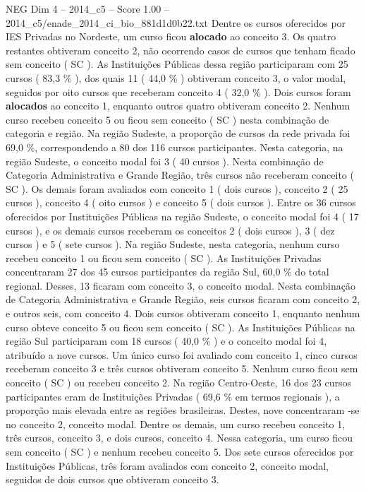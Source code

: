 \begin{textsample}{NEG Dim 4 – 2014\_c5 – Score 1.00 – 2014\_c5/enade\_2014\_ci\_bio\_881d1d0b22.txt}
Dentre os cursos oferecidos por IES Privadas no Nordeste, um curso ficou \textbf{alocado} ao conceito 3.
Os quatro restantes obtiveram conceito 2, não ocorrendo casos de cursos que tenham ficado sem conceito ( SC ).
As Instituições Públicas dessa região participaram com 25 cursos ( 83,3 \% ), dos quais 11 ( 44,0 \% ) obtiveram conceito 3, o valor modal, seguidos por oito cursos que receberam conceito 4 ( 32,0 \% ).
Dois cursos foram \textbf{alocados} ao conceito 1, enquanto outros quatro obtiveram conceito 2.
Nenhum curso recebeu conceito 5 ou ficou sem conceito ( SC ) nesta combinação de categoria e região.
Na região Sudeste, a proporção de cursos da rede privada foi 69,0 \%, correspondendo a 80 dos 116 cursos participantes.
Nesta categoria, na região Sudeste, o conceito modal foi 3 ( 40 cursos ).
Nesta combinação de Categoria Administrativa e Grande Região, três cursos não receberam conceito ( SC ).
Os demais foram avaliados com conceito 1 ( dois cursos ), conceito 2 ( 25 cursos ), conceito 4 ( oito cursos ) e conceito 5 ( dois cursos ).
Entre os 36 cursos oferecidos por Instituições Públicas na região Sudeste, o conceito modal foi 4 ( 17 cursos ), e os demais cursos receberam os conceitos 2 ( dois cursos ), 3 ( dez cursos ) e 5 ( sete cursos ).
Na região Sudeste, nesta categoria, nenhum curso recebeu conceito 1 ou ficou sem conceito ( SC ).
As Instituições Privadas concentraram 27 dos 45 cursos participantes da região Sul, 60,0 \% do total regional.
Desses, 13 ficaram com conceito 3, o conceito modal.
Nesta combinação de Categoria Administrativa e Grande Região, seis cursos ficaram com conceito 2, e outros seis, com conceito 4.
Dois cursos obtiveram conceito 1, enquanto nenhum curso obteve conceito 5 ou ficou sem conceito ( SC ).
As Instituições Públicas na região Sul participaram com 18 cursos ( 40,0 \% ) e o conceito modal foi 4, atribuído a nove cursos.
Um único curso foi avaliado com conceito 1, cinco cursos receberam conceito 3 e três cursos obtiveram conceito 5.
Nenhum curso ficou sem conceito ( SC ) ou recebeu conceito 2.
Na região Centro-Oeste, 16 dos 23 cursos participantes eram de Instituições Privadas ( 69,6 \% em termos regionais ), a proporção mais elevada entre as regiões brasileiras.
Destes, nove concentraram -se no conceito 2, conceito modal.
Dentre os demais, um curso recebeu conceito 1, três cursos, conceito 3, e dois cursos, conceito 4.
Nessa categoria, um curso ficou sem conceito ( SC ) e nenhum recebeu conceito 5.
Dos sete cursos oferecidos por Instituições Públicas, três foram avaliados com conceito 2, conceito modal, seguidos de dois cursos que obtiveram conceito 3.

\end{textsample}
